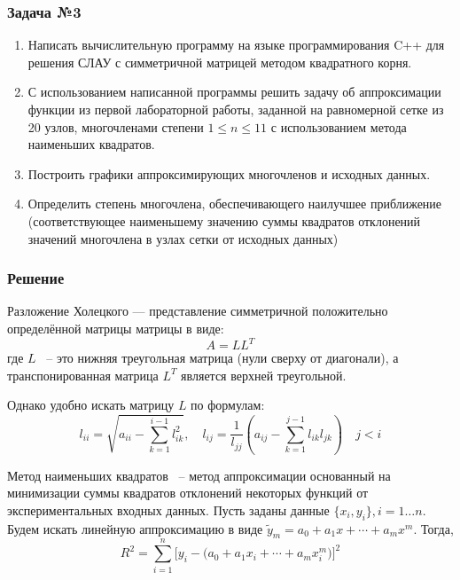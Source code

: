 \documentclass[a4paper, fontsize=14pt]{article}
\begin{document}
\subsubsection*{Задача №3}
\begin{enumerate}
    \item Написать вычислительную программу на языке программирования C++
          для решения СЛАУ с симметричной матрицей методом квадратного
          корня.
    \item С использованием написанной программы решить задачу об
          аппроксимации функции из первой лабораторной работы, заданной на
          равномерной сетке из 20 узлов, многочленами степени $1 \leq n \leq 11$ с
          использованием метода наименьших квадратов.
    \item Построить графики аппроксимирующих многочленов и исходных
          данных.
    \item Определить степень многочлена, обеспечивающего наилучшее
          приближение (соответствующее наименьшему значению суммы
          квадратов отклонений значений многочлена в узлах сетки от исходных
          данных)
\end{enumerate}
\subsubsection*{Решение}
Разложение Холецкого — представление симметричной положительно определённой матрицы матрицы в виде:
\begin{equation*}
    A = L L^T
\end{equation*}
где $L$ ~-- это нижняя треугольная матрица (нули сверху от
диагонали), а транспонированная матрица $L^T$ является верхней
треугольной.

Однако удобно искать матрицу $L$ по формулам:
\begin{equation*}
    l_{ii} = \sqrt{a_{ii} - \sum_{k=1}^{i-1} l^2_{ik}}, \quad l_{ij} = \frac{1}{l_{jj}} \left( a_{ij} - \sum_{k=1}^{j-1} l_{ik} l_{jk}\right) \quad j < i
\end{equation*}

Метод наименьших квадратов ~-- метод аппроксимации основанный на минимизации суммы квадратов отклонений некоторых функций от экспериментальных входных данных.
Пусть заданы данные $\{ x_i, y_i\}, i = 1 \dots n$. Будем искать линейную аппроксимацию в виде $\tilde{y}_m = a_0 + a_1 x + \cdots + a_m x^m$. Тогда,
\begin{equation*}
    R^2 = \sum_{i=1}^n \biggr[ y_i - \bigr(a_0 + a_1 x_i + \cdots + a_m x_i^m\bigr)\biggr]^2
\end{equation*}
\end{document}
